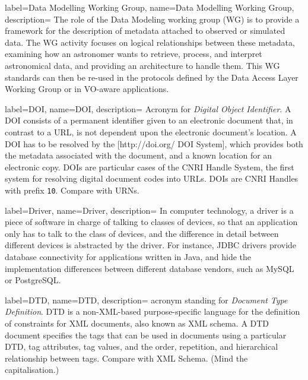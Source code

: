 {
    label={Data Modelling Working Group},
    name={Data Modelling Working Group},
    description={
    	The role of the Data Modeling working group (WG) is to provide
        a framework for the description of \gls{metadata} attached to
        observed or simulated data. The WG activity focuses on logical
        relationships between these metadata, examining how an
        astronomer wants to retrieve, process, and interpret
        astronomical data, and providing an architecture to handle
        them. This WG standards can then be re-used in the protocols
        defined by the \gls{Data Access Layer Working Group} or in
        VO-aware applications.
    }
}

{
    label={DOI},
    name={DOI},
    description={
    	Acronym for \emph{Digital Object Identifier}. A DOI consists of
        a permanent identifier given to an electronic document that, in
        contrast to a \gls{URL}, is not dependent upon the electronic
        document's location. A DOI has to be resolved by the
        [http://doi.org/ DOI System], which provides both the metadata
        associated with the document, and a known location for an
        electronic copy. DOIs are particular cases of the CNRI Handle
        System, the first system for resolving digital document codes
        into URLs. DOIs are CNRI Handles with prefix \texttt{10}.
        Compare with \gls{URN}s.
    }
}

{
    label={Driver},
    name={Driver},
    description={
    	In computer technology, a driver is a piece of software in
        charge of talking to classes of devices, so that an application
        only has to talk to the class of devices, and the difference in
        detail between different devices is abstracted by the driver.
        For instance, \gls{JDBC} drivers provide database connectivity
        for applications written in \gls{Java}, and hide the
        implementation differences between different database vendors,
        such as MySQL or PostgreSQL.
    }
}

{
    label={DTD},
    name={DTD},
    description={
    	acronym standing for \emph{Document Type Definition}. DTD is a
        non-XML-based purpose-specific language for the definition of
        constraints for \gls{XML} documents, also known as \gls{XML
        schema}. A DTD document specifies the \gls{tags} that can be
        used in documents using a particular DTD, tag \gls{attributes},
        tag values, and the order, repetition, and hierarchical
        relationship between tags. Compare with \gls{XML Schema}. (Mind
        the capitalisation.)
    }
}

